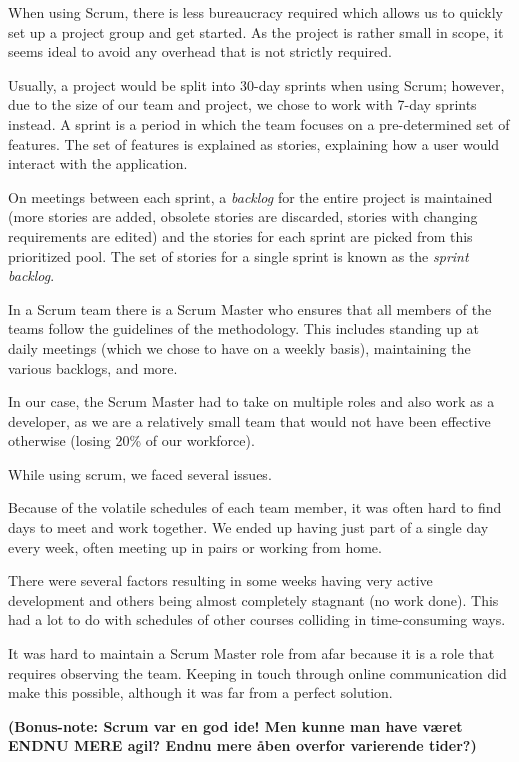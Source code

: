When using Scrum, there is less bureaucracy required\cite{caye} which allows us to quickly set up a project
group and get started. As the project is rather small in scope, it seems ideal to avoid any overhead
that is not strictly required.

Usually, a project would be split into 30-day sprints when using Scrum; however, due to the size of
our team and project, we chose to work with 7-day sprints instead. A sprint is a period in which the
team focuses on a pre-determined set of features. The set of features is explained as stories,
explaining how a user would interact with the application.

On meetings between each sprint, a \emph{backlog} for the entire project is maintained (more stories are
added, obsolete stories are discarded, stories with changing requirements are edited) and the stories
for each sprint are picked from this prioritized pool. The set of stories for a single sprint is known
as the \emph{sprint backlog}.

In a Scrum team there is a Scrum Master who ensures that all members of the teams follow the guidelines
of the methodology. This includes standing up at daily meetings (which we chose to have on a weekly basis),
maintaining the various backlogs, and more.

In our case, the Scrum Master had to take on multiple roles and also work as a developer, as we are a relatively
small team that would not have been effective otherwise (losing 20\% of our workforce).

While using scrum, we faced several issues.

Because of the volatile schedules of each team member, it was often hard to find days to meet and work
together. We ended up having just part of a single day every week, often meeting up in pairs or working
from home.

There were several factors resulting in some weeks having very active development and others being almost
completely stagnant (no work done). This had a lot to do with schedules of other courses colliding in
time-consuming ways.

It was hard to maintain a Scrum Master role from afar because it is a role that requires observing the
team. Keeping in touch through online communication did make this possible, although it was far from a perfect
solution.

\textbf{(Bonus-note: Scrum var en god ide! Men kunne man have været ENDNU MERE agil? Endnu mere åben overfor
varierende tider?)}
